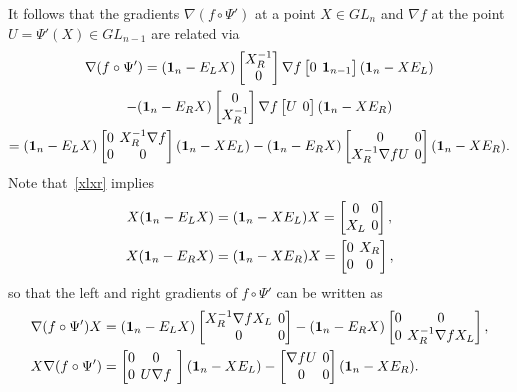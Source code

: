 \documentclass{amsart}
\theoremstyle{definition}
\theoremstyle{remark}
\numberwithin{equation}{section}
\numberwithin{theorem}{section}
\def\nablac{{\nabla}}
\def\nar{\setlength\arraycolsep{2pt}}
\def\one{\mathbf 1}
\begin{document}
 It follows that the gradients $\nabla (f\circ\Psi')$ at a point $X\in GL_n$ and 
$\nablac f$ at the point $U=\Psi'(X)\in GL_{n-1}$ are related via 
\begin{multline*}
\nabla(f\circ\Psi')=(\one_n-E_LX)\nar\begin{bmatrix} X_R^{-1}\cr0\end{bmatrix}\nablac f\begin{bmatrix} 0 &\one_{n-1}\end{bmatrix}
(\one_n-XE_L)\\
-(\one_n-E_RX)\nar\begin{bmatrix}0\cr X_R^{-1}\end{bmatrix}\nablac f\begin{bmatrix} U &0\end{bmatrix}(\one_n-XE_R)\\
=(\one_n-E_LX)\nar\begin{bmatrix} 0 & X_R^{-1}\nablac f\cr 0&0\end{bmatrix}(\one_n-XE_L)
-(\one_n-E_RX)\begin{bmatrix}0&0\cr X_R^{-1}\nablac fU&0\end{bmatrix}(\one_n-XE_R).
\end{multline*}
Note that~\eqref{xlxr} implies
\begin{equation}\label{XEX}
\begin{aligned}
X(\one_n-E_LX)&=(\one_n-XE_L)X=\nar\begin{bmatrix} 0 & 0\cr X_L &0\end{bmatrix},\\
X(\one_n-E_RX)&=(\one_n-XE_R)X=\nar\begin{bmatrix} 0 & X_R\cr 0 &0\end{bmatrix},
\end{aligned}
\end{equation}
so that the left and right gradients of $f\circ\Psi'$ can be written as
\[
\begin{aligned}
\nabla(f\circ\Psi') X&=(\one_n-E_LX)\nar\begin{bmatrix} X_R^{-1}\nablac f X_L &0\cr 0&0\end{bmatrix}
-(\one_n-E_RX)\begin{bmatrix}0&0\cr 0 &X_R^{-1}\nablac f X_L\end{bmatrix},\\
X\nabla(f\circ\Psi')&=\nar\begin{bmatrix}0& 0 &\cr 0& U\nablac f\end{bmatrix}(\one_n-XE_L)
-\begin{bmatrix}\nablac fU&0\cr 0&0\end{bmatrix}(\one_n-XE_R).
\end{aligned}
\]
\end{document}
